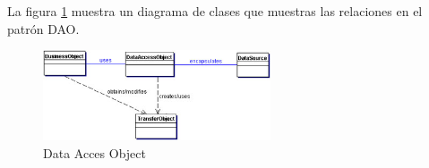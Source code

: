 
La figura \ref{fig:dao-structure} muestra un diagrama de clases que muestras las relaciones en el patrón DAO.  

\begin{figure}
  \centering
    \includegraphics[width=0.6\textwidth]{figuras/dao-structure.jpg}
  \caption{Data Acces Object}
  \label{fig:dao-structure}
\end{figure}


